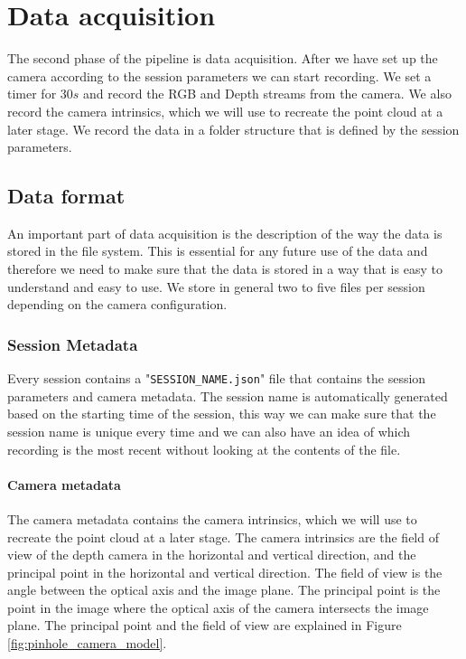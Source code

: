 \section{Data acquisition}

The second phase of the pipeline is data acquisition. After we have set up the camera according to the session parameters we can start recording. We set a timer for $30s$ and record the RGB and Depth streams from the camera. We also record the camera intrinsics, which we will use to recreate the point cloud at a later stage. We record the data in a folder structure that is defined by the session parameters.

\subsection{Data format}

An important part of data acquisition is the description of the way the data is stored in the file system. This is essential for any future use of the data and therefore we need to make sure that the data is stored in a way that is easy to understand and easy to use. We store in general two to five files per session depending on the camera configuration. 

\subsubsection{Session Metadata}

Every session contains a "\texttt{SESSION\_NAME.json}" file that contains the session parameters and camera metadata. The session name is automatically generated based on the starting time of the session, this way we can make sure that the session name is unique every time and we can also have an idea of which recording is the most recent without looking at the contents of the file.

\paragraph{Camera metadata}

The camera metadata contains the camera intrinsics, which we will use to recreate the point cloud at a later stage. The camera intrinsics are the field of view of the depth camera in the horizontal and vertical direction, and the principal point in the horizontal and vertical direction. The field of view is the angle between the optical axis and the image plane. The principal point is the point in the image where the optical axis of the camera intersects the image plane. The principal point and the field of view are explained in Figure \ref{fig:pinhole_camera_model}.

